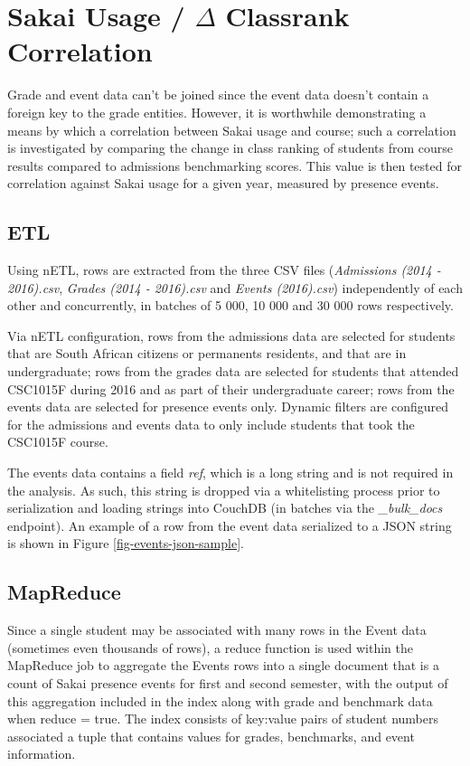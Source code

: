 \section{Sakai Usage / \texorpdfstring{$\Delta$}{Lg} Classrank Correlation}
Grade and event data can't be joined since the event data doesn't contain a foreign key to the grade entities. However, it is worthwhile demonstrating a means by which a correlation between Sakai usage and course; such a correlation is investigated by comparing the change in class ranking of students from course results compared to admissions benchmarking scores. This value is then tested for correlation against Sakai usage for a given year, measured by presence events.

\subsection{ETL}
Using nETL, rows are extracted from the three CSV files (\textit{Admissions (2014 - 2016).csv}, \textit{Grades (2014 - 2016).csv} and \textit{Events (2016).csv}) independently of each other and concurrently, in batches of 5 000, 10 000 and 30 000 rows respectively.

Via nETL configuration, rows from the admissions data are selected for students that are South African citizens or permanents residents, and that are in undergraduate; rows from the grades data are selected for students that attended CSC1015F during 2016 and as part of their undergraduate career; rows from the events data are selected for presence events only. Dynamic filters are configured for the admissions and events data to only include students that took the CSC1015F course.

The events data contains a field \textit{ref}, which is a long string and is not required in the analysis. As such, this string is dropped via a whitelisting process prior to serialization and loading strings into CouchDB (in batches via the \textit{\_bulk\_docs} endpoint). An example of a row from the event data serialized to a JSON string is shown in Figure \ref{fig-events-json-sample}.



\subsection{MapReduce}
Since a single student may be associated with many rows in the Event data (sometimes even thousands of rows), a reduce function is used within the MapReduce job to aggregate the Events rows into a single document that is a count of Sakai presence events for first and second semester, with the output of this aggregation included in the index along with grade and benchmark data when reduce = true. The index consists of key:value pairs of student numbers associated a tuple that contains values for grades, benchmarks, and event information.

